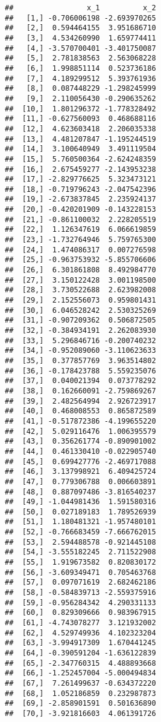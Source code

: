 \documentclass[
]{article}
\begin{document}
\begin{verbatim}
##                 x_1          x_2
##   [1,] -0.706006198 -2.693970265
##   [2,]  0.594464155  3.951686710
##   [3,]  4.534260990  1.659774411
##   [4,] -3.570700401 -3.401750087
##   [5,]  2.781838563  2.563068228
##   [6,]  1.998851114  0.523736186
##   [7,]  4.189299512  5.393761936
##   [8,]  0.087448229 -1.298245999
##   [9,]  2.110056430 -0.290635262
##  [10,]  1.801296372 -1.778328492
##  [11,] -0.627560093  0.468688116
##  [12,]  4.623603418  2.206035338
##  [13,]  4.481207847 -1.195244519
##  [14,]  3.100640949  3.491119504
##  [15,]  5.760500364 -2.624248359
##  [16,]  2.675459277 -2.143953238
##  [17,] -2.829776625  5.323473121
##  [18,] -0.719796243 -2.047542396
##  [19,] -2.673837845  2.235924137
##  [20,] -0.420201909 -0.143228153
##  [21,] -0.861100032  2.228205519
##  [22,]  1.126347619  6.066619859
##  [23,] -1.732764946  5.759765300
##  [24,]  1.474086317  0.007276598
##  [25,] -0.963753932 -5.855706606
##  [26,]  6.301861808  8.492984770
##  [27,]  3.150122428  3.001198500
##  [28,]  3.730522688  2.623982008
##  [29,]  2.152556073  0.959801431
##  [30,]  6.046528242  2.530325269
##  [31,] -0.907209362  0.506872505
##  [32,] -0.384934191  2.262083930
##  [33,]  5.296846716 -0.200740232
##  [34,] -0.952089060 -3.110623633
##  [35,]  0.377857769  3.963514802
##  [36,] -0.178423788  5.559235076
##  [37,]  0.040021394  0.073778292
##  [38,]  0.162660091 -2.759869267
##  [39,]  2.482564994  2.926723917
##  [40,]  0.468008553  0.865872589
##  [41,] -0.517872386 -4.199655220
##  [42,]  5.029116476  1.006395579
##  [43,]  0.356261774 -0.890901002
##  [44,]  0.461330410 -0.022905740
##  [45,]  0.699427776 -2.469717088
##  [46,]  3.137998921  6.409425724
##  [47,]  0.779306788  0.006603891
##  [48,]  0.887097486 -3.816540237
##  [49,] -1.044981436  1.591580316
##  [50,]  0.027189183  1.789526939
##  [51,]  1.180481321 -1.957480101
##  [52,] -0.766683459 -7.666762015
##  [53,]  2.594488578 -0.921445108
##  [54,] -3.555182245  2.711522908
##  [55,]  1.919673582  0.820830172
##  [56,] -3.609349471  0.705463768
##  [57,]  0.097071619  2.682462186
##  [58,] -0.584839713 -2.559375916
##  [59,] -0.956284342  4.290331133
##  [60,]  0.829309666  0.983967915
##  [61,] -4.743078277  3.121932002
##  [62,]  4.529749936  4.102323204
##  [63,] -3.994917309  1.670441245
##  [64,] -0.390591204 -1.636122839
##  [65,] -2.347760315  4.488893668
##  [66,] -1.252457004 -5.000494834
##  [67,]  7.261499637 -0.634372220
##  [68,]  1.052186859  0.232987873
##  [69,] -2.858901591  0.501636890
##  [70,] -3.921816603  4.061391726

\end{verbatim}
\end{document}
